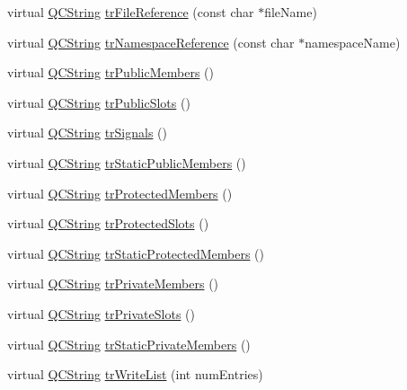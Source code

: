 \begin{DoxyCompactItemize}
\item 
virtual \hyperlink{class_q_c_string}{Q\+C\+String} \hyperlink{class_translator_serbian_cyrillic_a5b07bccc45c0ecb20569c0e7498be85b}{tr\+File\+Reference} (const char $\ast$file\+Name)
\item 
virtual \hyperlink{class_q_c_string}{Q\+C\+String} \hyperlink{class_translator_serbian_cyrillic_aadf4c3fce77f99128f445a464855e81e}{tr\+Namespace\+Reference} (const char $\ast$namespace\+Name)
\item 
virtual \hyperlink{class_q_c_string}{Q\+C\+String} \hyperlink{class_translator_serbian_cyrillic_a2ccfeaab9aca225ccce1167126e935c6}{tr\+Public\+Members} ()
\item 
virtual \hyperlink{class_q_c_string}{Q\+C\+String} \hyperlink{class_translator_serbian_cyrillic_a8224dae70fc7f4d7e72d0865cc917096}{tr\+Public\+Slots} ()
\item 
virtual \hyperlink{class_q_c_string}{Q\+C\+String} \hyperlink{class_translator_serbian_cyrillic_a1cf6d4b03ebf73e57b8f58bf7e806ed3}{tr\+Signals} ()
\item 
virtual \hyperlink{class_q_c_string}{Q\+C\+String} \hyperlink{class_translator_serbian_cyrillic_a2847c6864488932b7f3208952c7ca398}{tr\+Static\+Public\+Members} ()
\item 
virtual \hyperlink{class_q_c_string}{Q\+C\+String} \hyperlink{class_translator_serbian_cyrillic_a625493fc12ecfdb5d6e9affd7d022530}{tr\+Protected\+Members} ()
\item 
virtual \hyperlink{class_q_c_string}{Q\+C\+String} \hyperlink{class_translator_serbian_cyrillic_a9e83cbac88917f938ea61a34bfc60d79}{tr\+Protected\+Slots} ()
\item 
virtual \hyperlink{class_q_c_string}{Q\+C\+String} \hyperlink{class_translator_serbian_cyrillic_a7c344f16b109aa0feb26686b6f2617f4}{tr\+Static\+Protected\+Members} ()
\item 
virtual \hyperlink{class_q_c_string}{Q\+C\+String} \hyperlink{class_translator_serbian_cyrillic_abe373cf6585ffa10560fd1b453f7abfe}{tr\+Private\+Members} ()
\item 
virtual \hyperlink{class_q_c_string}{Q\+C\+String} \hyperlink{class_translator_serbian_cyrillic_a53804f99d9825fc5d860e27c377c365f}{tr\+Private\+Slots} ()
\item 
virtual \hyperlink{class_q_c_string}{Q\+C\+String} \hyperlink{class_translator_serbian_cyrillic_a3d6f1fe7e9eed47e59d53d5f70ed399b}{tr\+Static\+Private\+Members} ()
\item 
virtual \hyperlink{class_q_c_string}{Q\+C\+String} \hyperlink{class_translator_serbian_cyrillic_a81566dcedef6e5bea69d42cbc36ce9d8}{tr\+Write\+List} (int num\+Entries)

\end{DoxyCompactItemize}

